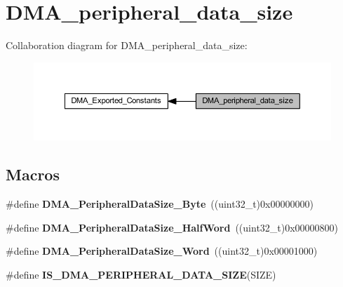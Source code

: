 \hypertarget{group___d_m_a__peripheral__data__size}{}\section{D\+M\+A\+\_\+peripheral\+\_\+data\+\_\+size}
\label{group___d_m_a__peripheral__data__size}
Collaboration diagram for D\+M\+A\+\_\+peripheral\+\_\+data\+\_\+size\+:\nopagebreak
\begin{figure}[H]
\begin{center}
\leavevmode
\includegraphics[width=350pt]{group___d_m_a__peripheral__data__size}
\end{center}
\end{figure}
\subsection*{Macros}
\begin{DoxyCompactItemize}
\item 
\mbox{\label{group___d_m_a__peripheral__data__size_ga7577035ae4ff413164000227a8cea346}} 
\#define {\bfseries D\+M\+A\+\_\+\+Peripheral\+Data\+Size\+\_\+\+Byte}~((uint32\+\_\+t)0x00000000)
\item 
\mbox{\label{group___d_m_a__peripheral__data__size_gab1988e5005ee65c261018f62866e4585}} 
\#define {\bfseries D\+M\+A\+\_\+\+Peripheral\+Data\+Size\+\_\+\+Half\+Word}~((uint32\+\_\+t)0x00000800)
\item 
\mbox{\label{group___d_m_a__peripheral__data__size_ga516ea7a40945d8325fe73e079b245ea1}} 
\#define {\bfseries D\+M\+A\+\_\+\+Peripheral\+Data\+Size\+\_\+\+Word}~((uint32\+\_\+t)0x00001000)
\item 
\#define {\bfseries I\+S\+\_\+\+D\+M\+A\+\_\+\+P\+E\+R\+I\+P\+H\+E\+R\+A\+L\+\_\+\+D\+A\+T\+A\+\_\+\+S\+I\+ZE}(S\+I\+ZE)
\end{DoxyCompactItemize}


